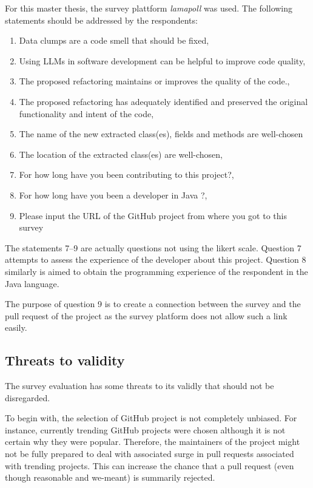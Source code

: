 For this master thesis, the survey plattform \textit{lamapoll} \cite{lamapoll} was used.  The following statements should be addressed by the respondents:
\begin{enumerate}
\item Data clumps are a code smell that should be fixed, 
\item Using LLMs in software development can be helpful to improve code quality,
\item The proposed refactoring maintains or improves the quality of the code.,
\item The proposed refactoring has  adequately identified and preserved the original functionality and intent of the code, 
\item The name of the new extracted class(es), fields and methods are well-chosen
 \item The location of the extracted class(es) are well-chosen,
 \item For how long have you been contributing to this project?,
\item For how long have you been a developer in Java ?, 
\item Please input the URL of the GitHub project from where you got to this survey

\end{enumerate}


The statements 7--9 are actually questions not using the likert scale. Question 7 attempts to assess the experience of the developer about this project. Question 8 similarly is aimed to obtain the programming experience of the respondent in the Java language.

The purpose of question 9 is to create a connection between the survey and the pull request of the project as the survey platform does not allow such a link easily. 
\subsection{Threats to validity}

The survey evaluation has some threats to its validly that should not be disregarded.

To begin with, the selection of GitHub project is not completely unbiased. For instance, currently trending GitHub projects were chosen although it is not certain why they were popular. Therefore, the maintainers of the project might not be fully prepared to deal with associated surge in pull requests associated with trending projects. This can increase the chance that a pull request (even though reasonable and we-meant) is summarily rejected. \cite{10.1145/3366423.3380272}

